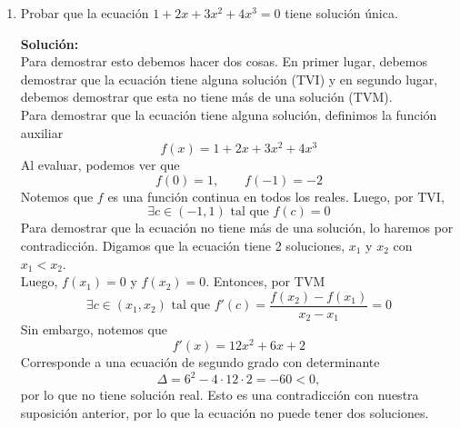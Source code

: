 \documentclass[12pt]{article}
\newenvironment{solucion}
{\begin{mdframed}[backgroundcolor=black!10]
		{\bf Solución:}\\
	}
	{
	\end{mdframed}
}
\newenvironment{preguntas}
{\begin{enumerate}\itemsep12pt
	}
	{
	\end{enumerate}
}
\newcommand{\ra}{\rightarrow}
\begin{document}
\begin{preguntas}
\begin{solucion}
Luego, tendremos los siguientes escenarios.\\

Para $k \in (-2,2)$, no habrá ningún punto crítico, ya que la ecuación anterior no tiene solución.\\

Para $k = 2$, habrá un punto crítico en $x=k$. Además, este punto crítico será un punto de inflexión.\\

Para $k\in (-\infty, -2) \cup (2, \infty)$, habrán dos puntos críticos en 
$$x = k + \sqrt[]{k^2-4} \qquad y \qquad x = k - \sqrt[]{k^2-4}$$
Notemos además que para $x < k \ra f''(x) < 0$ y para $x > k \ra f''(x) > 0$, por lo que el punto crítico $x = k + \sqrt[]{k^2-4} > k$ corresponderá a un mínimo y $x = k - \sqrt[]{k^2-4} < k$ corresponderá a un máximo.
\end{solucion}
\item Probar que la ecuación $1+2x+3x^2+4x^3=0$ tiene solución única.
\begin{solucion}
Para demostrar esto debemos hacer dos cosas. En primer lugar, debemos demostrar que la ecuación tiene alguna solución (TVI) y en segundo lugar, debemos demostrar que esta no tiene más de una solución (TVM).\\

Para demostrar que la ecuación tiene alguna solución, definimos la función auxiliar
$$f(x) = 1+2x+3x^2+4x^3$$
Al evaluar, podemos ver que
$$f(0) = 1, \qquad f(-1) = -2$$
Notemos que $f$ es una función continua en todos los reales. Luego, por TVI, 
$$\exists c \in (-1,1) \text{ tal que } f(c) = 0$$
Para demostrar que la ecuación no tiene más de una solución, lo haremos por contradicción. Digamos que la ecuación tiene 2 soluciones, $x_1$ y $x_2$ con $x_1 < x_2$.\\

Luego, $f(x_1) = 0$ y $f(x_2) = 0$. Entonces, por TVM
$$\exists c \in (x_1, x_2) \text{ tal que } f'(c) = \dfrac{f(x_2) - f(x_1)}{x_2-x_1} = 0$$
Sin embargo, notemos que
$$f'(x) = 12x^2 + 6x + 2$$
Corresponde a una ecuación de segundo grado con determinante 
$$\Delta = 6^2-4\cdot 12 \cdot 2 = -60 < 0,$$
por lo que no tiene solución real. Esto es una contradicción con nuestra suposición anterior, por lo que la ecuación no puede tener dos soluciones.\\


\end{solucion}
\end{preguntas}
\end{document}
